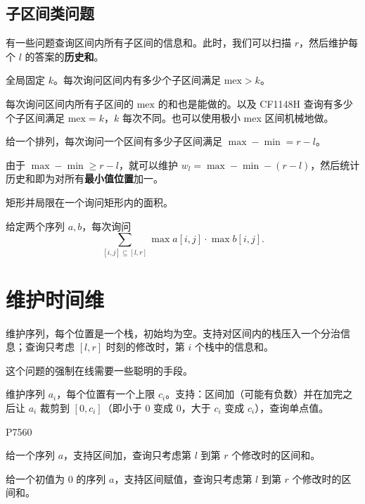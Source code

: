 \subsection{子区间类问题}
有一些问题查询区间内所有子区间的信息和。此时，我们可以扫描 $r$，然后维护每个 $l$ 的答案的\textbf{历史和}。

\begin{example}
    全局固定 $k$。每次询问区间内有多少个子区间满足 $\mathrm{mex}>k$。
\end{example}
\begin{remark}
    每次询问区间内所有子区间的 $\mathrm{mex}$ 的和也是能做的。以及 CF1148H 查询有多少个子区间满足 $\mathrm{mex}=k$，$k$ 每次不同。也可以使用极小 mex 区间机械地做。
\end{remark}

\begin{example}
    给一个排列，每次询问一个区间有多少子区间满足 $\max-\min=r-l$。
    \begin{hint}
        由于 $\max-\min\ge r-l$，就可以维护 $w_l=\max-\min-(r-l)$，然后统计历史和即为对所有\textbf{最小值位置}加一。
    \end{hint}
\end{example}

\begin{example}[带有询问矩形的矩形面积并]
    矩形并局限在一个询问矩形内的面积。
\end{example}

\begin{example}[NOIP 2022 比赛]
    给定两个序列 $a,b$，每次询问
    $$
    \sum_{[i,j]\subseteq [l,r]}\max a[i,j]\cdot\max b[i,j].
    $$
\end{example}

\section{维护时间维}

\begin{example}
    维护序列，每个位置是一个栈，初始均为空。支持对区间内的栈压入一个分治信息；查询只考虑 $[l,r]$ 时刻的修改时，第 $i$ 个栈中的信息和。
\end{example}
\begin{remark}
    这个问题的强制在线需要一些聪明的手段。
\end{remark}
\begin{example}
    维护序列 $a_i$，每个位置有一个上限 $c_i$。支持：区间加（可能有负数）并在加完之后让 $a_i$ 裁剪到 $[0,c_i]$（即小于 $0$ 变成 $0$，大于 $c_i$ 变成 $c_i$），查询单点值。
\end{example}
\begin{exercise}
    P7560
\end{exercise}

\begin{example}
    给一个序列 $a$，支持区间加，查询只考虑第 $l$ 到第 $r$ 个修改时的区间和。
\end{example}
\begin{example}[P8512]
    给一个初值为 $0$ 的序列 $a$，支持区间赋值，查询只考虑第 $l$ 到第 $r$ 个修改时的区间和。
\end{example}


